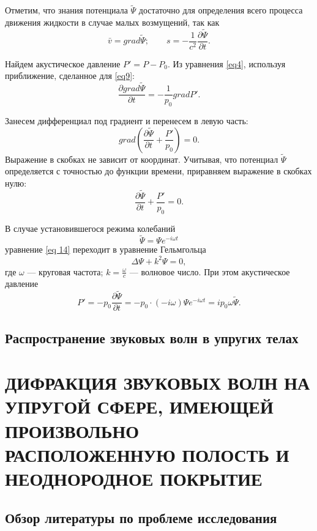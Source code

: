Отметим, что знания потенциала $\tilde\Psi$ достаточно для определения всего процесса движения жидкости в случае малых возмущений, так как
$$
\bar{v}= grad\tilde\Psi;\qquad s=-\frac{1}{c^2}\frac{\partial\tilde\Psi}{\partial t}.
$$

Найдем акустическое давление $P'=P-P_0$. Из уравнения \eqref{eq4}, используя приближение, сделанное для \eqref{eq9}:
$$
\frac{\partial  grad \tilde\Psi}{\partial t} = - \frac{1}{p_0} grad P'.
$$

Занесем дифференциал под градиент и перенесем в левую часть:
$$
 grad \left(\frac{\partial \tilde\Psi}{\partial t} + \frac{P'}{p_0}\right) = 0.
$$
Выражение в скобках не зависит от координат. Учитывая, что потенциал $\tilde\Psi$ определяется с точностью до функции времени, приравняем выражение в скобках нулю:
$$
\frac{\partial \tilde\Psi}{\partial t} + \frac{P'}{p_0} = 0.
$$

В случае установившегося режима колебаний
\begin{equation}\label{eq 15}
\tilde\Psi=\Psi  e^{-i\omega t}
\end{equation}
уравнение \eqref{eq 14} переходит в уравнение Гельмгольца
\begin{equation}\label{eq 16}
\Delta{\Psi}+k^2\Psi=0,
\end{equation}
где $\omega$ --- круговая частота; $k=\frac{\omega}{c}$ --- волновое число.
При этом акустическое давление 
$$
P'=-p_0 \frac{\partial \tilde\Psi}{\partial t}=-p_0 \cdot (-i \omega) \Psi  e^{-i\omega t}=ip_0\omega\tilde{\Psi}.
$$


\newpage
\subsection{Распространение звуковых волн в упругих телах}




\newpage
\section{ДИФРАКЦИЯ ЗВУКОВЫХ ВОЛН НА УПРУГОЙ СФЕРЕ, ИМЕЮЩЕЙ ПРОИЗВОЛЬНО РАСПОЛОЖЕННУЮ ПОЛОСТЬ И НЕОДНОРОДНОЕ ПОКРЫТИЕ}

\newpage
\subsection{Обзор литературы по проблеме исследования}


\newpage
